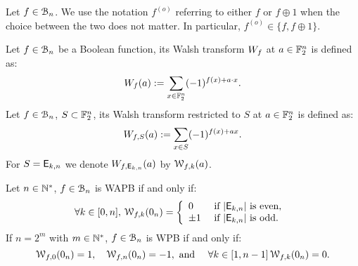 \documentclass[11pt]{llncs}
\begin{document}
\begin{remark}
    Let $f\in \mathcal{B}_{n}$. We use the notation $f^{(o)}$ referring to either $f$ or $f\oplus1$ when the choice between the two does not matter. In particular, $f^{(o)} \in \{f, f\oplus 1\}$.
\end{remark}



\begin{definition}\label{def:walsh_transform}
	Let $f\in \mathcal{B}_{n}$ be a Boolean function, its Walsh transform $W_{f}$ at $a \in \mathbb{F}_2^n$ is defined as:
	\[  W_{f} (a) := \sum_{x \in \mathbb{F}_2^n} (-1)^{f(x) +  a \cdot x }.\]
	Let $f\in \mathcal{B}_{n}$, $S \subset \mathbb{F}_2^n$, its Walsh transform restricted to $S$ at $a \in \mathbb{F}_2^n$ is defined as:
	\[  W_{f,S} (a) := \sum_{x\in S} (-1)^{f(x)+ax}.\]
	For $S=\mathsf{E}_{k,n}$ we denote $W_{f,\mathsf{E}_{k,n}} (a)$ by $\mathcal{W}_{f,k}(a)$.%
	
\end{definition}

\begin{Prop}\label{prop:WAPBWalsh}
	
Let $n\in \mathbb{N}^*$, $f\in \mathcal{B}_{n}$ is WAPB if and only if:
\[\forall k \in [0,n], \, \mathcal{W}_{f,k}(0_n)=   
\left \{
\begin{array}{l l}
0  & \text{ if } |\mathsf{E}_{k,n}| \text{ is even, } \\
\pm 1 & \text{ if }  |\mathsf{E}_{k,n}| \text{ is odd.}
\end{array}\right. \] 
If $n=2^m$ with $m\in \mathbb{N}^*$, $f\in \mathcal{B}_{n}$ is WPB if and only if:
\[\mathcal{W}_{f,0}(0_n)=1, \quad \mathcal{W}_{f,n}(0_n)=-1, \text{ and } \quad \forall k \in [1,n-1] \,  \mathcal{W}_{f,k}(0_n)=0. \] 
	
\end{Prop}
\end{document}
